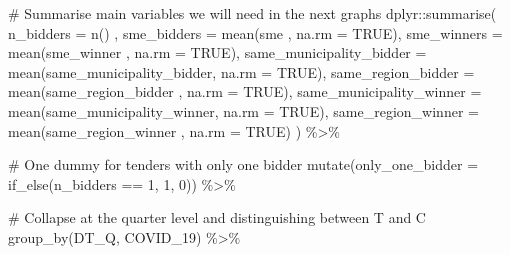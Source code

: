 \documentclass[
]{report}
\newenvironment{Shaded}{\begin{snugshade}}{\end{snugshade}}
\newcommand{\AttributeTok}[1]{\textcolor[rgb]{0.40,0.45,0.13}{#1}}
\newcommand{\CommentTok}[1]{\textcolor[rgb]{0.37,0.37,0.37}{#1}}
\newcommand{\ConstantTok}[1]{\textcolor[rgb]{0.56,0.35,0.01}{#1}}
\newcommand{\DecValTok}[1]{\textcolor[rgb]{0.68,0.00,0.00}{#1}}
\newcommand{\FunctionTok}[1]{\textcolor[rgb]{0.28,0.35,0.67}{#1}}
\newcommand{\NormalTok}[1]{\textcolor[rgb]{0.00,0.23,0.31}{#1}}
\newcommand{\SpecialCharTok}[1]{\textcolor[rgb]{0.37,0.37,0.37}{#1}}
\begin{document}
\begin{Shaded}
\begin{Highlighting}[]
  \CommentTok{\# Summarise main variables we will need in the next graphs}
\NormalTok{  dplyr}\SpecialCharTok{::}\FunctionTok{summarise}\NormalTok{(}
    \AttributeTok{n\_bidders                =}    \FunctionTok{n}\NormalTok{()                                      ,}
    \AttributeTok{sme\_bidders              =} \FunctionTok{mean}\NormalTok{(sme                     , }\AttributeTok{na.rm =} \ConstantTok{TRUE}\NormalTok{),}
    \AttributeTok{sme\_winners              =} \FunctionTok{mean}\NormalTok{(sme\_winner              , }\AttributeTok{na.rm =} \ConstantTok{TRUE}\NormalTok{),}
    \AttributeTok{same\_municipality\_bidder =} \FunctionTok{mean}\NormalTok{(same\_municipality\_bidder, }\AttributeTok{na.rm =} \ConstantTok{TRUE}\NormalTok{),}
    \AttributeTok{same\_region\_bidder       =} \FunctionTok{mean}\NormalTok{(same\_region\_bidder      , }\AttributeTok{na.rm =} \ConstantTok{TRUE}\NormalTok{),}
    \AttributeTok{same\_municipality\_winner =} \FunctionTok{mean}\NormalTok{(same\_municipality\_winner, }\AttributeTok{na.rm =} \ConstantTok{TRUE}\NormalTok{),}
    \AttributeTok{same\_region\_winner       =} \FunctionTok{mean}\NormalTok{(same\_region\_winner      , }\AttributeTok{na.rm =} \ConstantTok{TRUE}\NormalTok{)}
\NormalTok{  )   }\SpecialCharTok{\%\textgreater{}\%}
  
  \CommentTok{\# One dummy for tenders with only one bidder}
  \FunctionTok{mutate}\NormalTok{(}\AttributeTok{only\_one\_bidder =} \FunctionTok{if\_else}\NormalTok{(n\_bidders }\SpecialCharTok{==} \DecValTok{1}\NormalTok{, }\DecValTok{1}\NormalTok{, }\DecValTok{0}\NormalTok{)) }\SpecialCharTok{\%\textgreater{}\%} 
  
  \CommentTok{\# Collapse at the quarter level and distinguishing between T and C }
  \FunctionTok{group\_by}\NormalTok{(DT\_Q, COVID\_19) }\SpecialCharTok{\%\textgreater{}\%} 
  

\end{Highlighting}
\end{Shaded}
\end{document}
